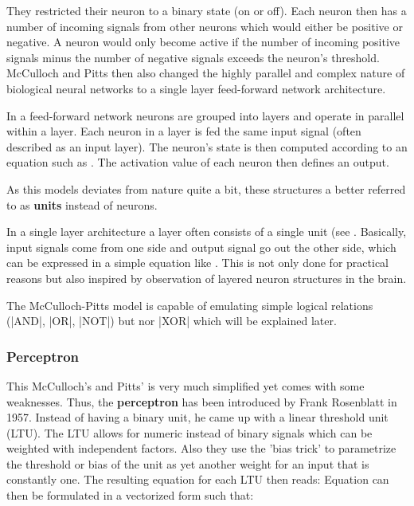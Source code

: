 They restricted their neuron to a binary state (on or off).
Each neuron then has a number of incoming signals from other neurons which would either be positive or negative.
A neuron would only become active if the number of incoming positive signals minus the number of negative signals exceeds the neuron's threshold.
McCulloch and Pitts then also changed the highly parallel and complex nature of biological neural networks to a single layer feed-forward network architecture.

In a feed-forward network neurons are grouped into layers and operate in parallel within a layer.
Each neuron in a layer is fed the same input signal (often described as an input layer).
The neuron's state is then computed according to an equation such as .
The activation value of each neuron then defines an output.

As this models deviates from nature quite a bit, these structures a better referred to as \textbf{units} instead of neurons.

In a single layer architecture a layer often consists of a single unit (see .
Basically, input signals come from one side and output signal go out the other side, which can be expressed in a simple equation like .
This is not only done for practical reasons but also inspired by observation of layered neuron structures in the brain.

The McCulloch-Pitts model is capable of emulating simple logical relations (|AND|, |OR|, |NOT|) but nor |XOR| which will be explained later.

\subsubsection{Perceptron}
This McCulloch's and Pitts' is very much simplified yet comes with some weaknesses.
Thus, the \textbf{perceptron} has been introduced by Frank Rosenblatt in 1957.
Instead of having a binary unit, he came up with a linear threshold unit (LTU).
The LTU allows for numeric instead of binary signals which can be weighted with independent factors.
Also they use the 'bias trick' to parametrize the threshold or bias of the unit as yet another weight for an input that is constantly one.
The resulting equation for each LTU then reads:
Equation  can then be formulated in a vectorized form such that:

